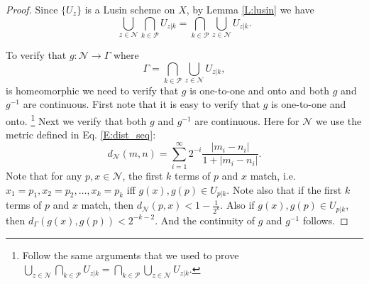 \begin{proof}
Since $\{U_z\}$ is a Lusin scheme on $X$, by Lemma \ref{L:lusin} we have
\[
	\bigcup_{z\in\mathcal{N}} \bigcap_{k\in\mathcal{P}} U_{z|k}
	  =\bigcap_{k\in\mathcal{P}} \bigcup_{z\in\mathcal{N}} U_{z|k}.
\]


To verify that $g:\mathcal{N}\to \Gamma$ where
\[
	\Gamma=\bigcap_{k\in\mathcal{P}} \bigcup_{z\in\mathcal{N}} U_{z|k},
\]
is homeomorphic we need to verify that $g$ is one-to-one and onto and
both $g$ and $g^{-1}$ are continuous. 
First note that it is easy to verify that $g$ is one-to-one and onto.
\footnote{Follow the same arguments that we used to prove
$\bigcup_{z\in\mathcal{N}} \bigcap_{k\in\mathcal{P}} U_{z|k}
		=\bigcap_{k\in\mathcal{P}} \bigcup_{z\in\mathcal{N}} U_{z|k}$.}
Next we verify that both $g$ and $g^{-1}$ are continuous.
Here for $\mathcal{N}$ we use the metric defined in Eq. \ref{E:dist_seq}:
\[
	d_{\mathcal{N}}(m,n) 
	  = \sum_{i=1}^{\infty} 2^{-i} \frac{|m_i-n_i|}{1+|m_i-n_i|}.
\]
Note that for any $p,x\in\mathcal{N}$, the first $k$ terms of $p$ and $x$ 
match, i.e. $x_1=p_1,x_2=p_2, \dots, x_k=p_k$
iff $g(x),g(p)\in U_{p|k}$. Note also that if the first $k$ terms of $p$ and $x$
match, then $d_{\mathcal{N}}(p,x) < 1-\frac{1}{2^k}$. Also if 
$g(x),g(p)\in U_{p|k}$, then $d_{\Gamma}(g(x),g(p)) < 2^{-k-2}$. And the
continuity of $g$ and $g^{-1}$ follows.


% 
% 

\end{proof}

